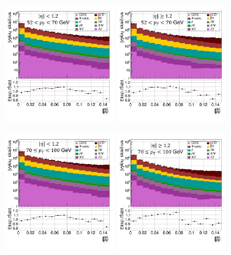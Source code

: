 \documentclass[a4paper, 12pt, oneside]{article}
\begin{document}
\begin{figure}[H]
	\includegraphics[width=0.42\textwidth]{Magistrinis/TFIT_nume_barrel_50to70.png}
	\includegraphics[width=0.42\textwidth]{Magistrinis/TFIT_nume_endcap_50to70.png}
\end{figure}
\vspace{-1cm}
\begin{figure}[H]
	\includegraphics[width=0.42\textwidth]{Magistrinis/TFIT_nume_barrel_70to100.png}
	\includegraphics[width=0.42\textwidth]{Magistrinis/TFIT_nume_endcap_70to100.png}
\end{figure}
\end{document}
